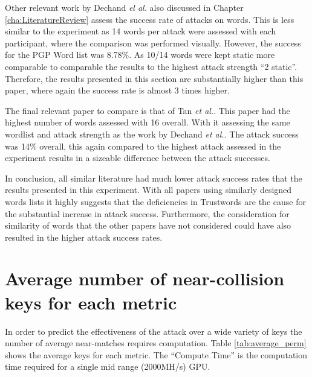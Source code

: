 Other relevant work by Dechand \textit{el al.}\cite{dechand2016empirical} also discussed in Chapter \ref{cha:LiteratureReview} assess the success rate of attacks on words. This is less similar to the experiment as 14 words per attack were assessed with each participant, where the comparison was performed visually. However, the success for the PGP Word list was 8.78\%. As 10/14 words were kept static more comparable to comparable the results to the highest attack strength ``2 static''. Therefore, the results presented in this section are substantially higher than this paper, where again the success rate is almost 3 times higher.

The final relevant paper to compare is that of Tan \textit{et al.}. This paper had the highest number of words assessed with 16 overall. With it assessing the same wordlist and attack strength as the work by Dechand \textit{et al.}. The attack success was 14\% overall, this again compared to the highest attack assessed in the experiment results in a sizeable difference between the attack successes.

In conclusion, all similar literature had much lower attack success rates that the results presented in this experiment. With all papers using similarly designed words lists it highly suggests that the deficiencies in Trustwords are the cause for the substantial increase in attack success. Furthermore, the consideration for similarity of words that the other papers have not considered could have also resulted in the higher attack success rates.


\section{Average number of near-collision keys for each metric}
In order to predict the effectiveness of the attack over a wide variety of keys the number of average near-matches requires computation. Table \ref{tab:average_perm} shows the average keys for each metric. The ``Compute Time'' is the computation time required for a single mid range (2000MH/s) GPU.

